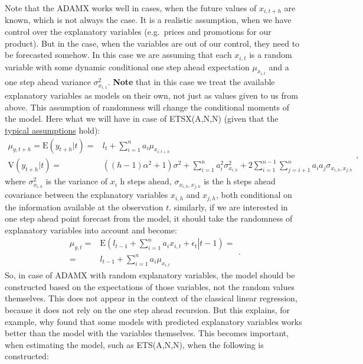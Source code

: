 \documentclass[
]{book}
\theoremstyle{definition}
\theoremstyle{definition}
\theoremstyle{definition}
\theoremstyle{definition}
\theoremstyle{remark}
\begin{document}
Note that the ADAMX works well in cases, when the future values of \(x_{i,t+h}\) are known, which is not always the case. It is a realistic assumption, when we have control over the explanatory variables (e.g.~prices and promotions for our product). But in the case, when the variables are out of our control, they need to be forecasted somehow. In this case we are assuming that each \(x_{i,t}\) is a random variable with some dynamic conditional one step ahead expectation \(\mu_{x_{i,t}}\) and a one step ahead variance \(\sigma^2_{x_{i,1}}\). \textbf{Note} that in this case we treat the available explanatory variables as models on their own, not just as values given to us from above. This assumption of randomness will change the conditional moments of the model. Here what we will have in case of ETSX(A,N,N) (given that the \protect\hyperlink{assumptions}{typical assumptions} hold):
\begin{equation}
  \begin{aligned}
    \mu_{y,t+h} = \text{E}(y_{t+h}|t) = & l_{t} + \sum_{i=1}^n a_i \mu_{x_{i,t+h}} \\
    \text{V}(y_{t+h}|t) = & \left((h-1) \alpha^2 + 1 \right) \sigma^2 + \sum_{i=1}^n a^2_i \sigma^2_{x_{i,h}} + 2 \sum_{i=1}^{n-1} \sum_{j=i+1}^n a_i a_j \sigma_{x_{i,h},x_{j,h}}
  \end{aligned},
  \label{eq:ETSXADAMStateSpaceANNRecursionMeanAndVarianceRandomness}
\end{equation}
where \(\sigma^2_{x_{i,h}}\) is the variance of \(x_{i}\) h steps ahead, \(\sigma_{x_{i,h},x_{j,h}}\) is the h steps ahead covariance between the explanatory variables \(x_{i,h}\) and \(x_{j,h}\), both conditional on the information available at the observation \(t\). similarly, if we are interested in one step ahead point forecast from the model, it should take the randomness of explanatory variables into account and become:
\begin{equation}
  \begin{aligned}
    \mu_{y,t} = &  \left. \mathrm{E}\left(l_{t-1} + \sum_{i=1}^n a_i x_{i,t} + \epsilon_{t} \right| t-1 \right) = \\
                = & l_{t-1} + \sum_{i=1}^n a_i \mu_{x_{i,t}}
  \end{aligned}.
  \label{eq:ADAMETSXANNStepAhead}
\end{equation}
So, in case of ADAMX with random explanatory variables, the model should be constructed based on the expectations of those variables, not the random values themselves. This does not appear in the context of the classical linear regression, because it does not rely on the one step ahead recursion. But this explains, for example, why \citet{Athanasopoulos2011} found that some models with predicted explanatory variables works better than the model with the variables themselves. This becomes important, when estimating the model, such as ETS(A,N,N), when the following is constructed:
\end{document}
